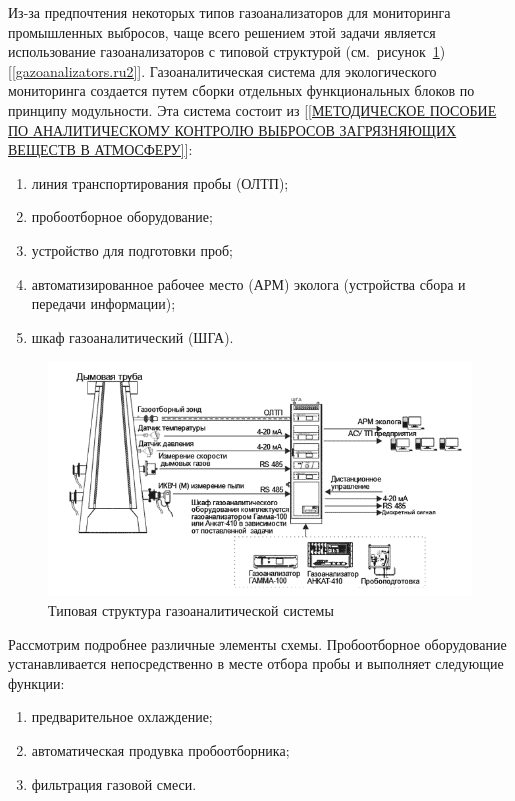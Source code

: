 \documentclass[14pt, a4paper]{extreport}
\begin{document}
	Из-за предпочтения некоторых типов газоанализаторов для мониторинга промышленных выбросов, чаще всего решением этой задачи является использование газоанализаторов с типовой структурой (см.~рисунок~\ref{fig:typestructure}) [\ref{gazoanalizators.ru2}]. Газоаналитическая система для экологического мониторинга создается путем сборки отдельных функциональных блоков по принципу модульности. Эта система состоит из [\ref{МЕТОДИЧЕСКОЕ ПОСОБИЕ ПО АНАЛИТИЧЕСКОМУ КОНТРОЛЮ ВЫБРОСОВ ЗАГРЯЗНЯЮЩИХ ВЕЩЕСТВ В АТМОСФЕРУ}]:
	\begin{enumerate}[label={\arabic*)}]
		\item линия транспортирования пробы (ОЛТП);
		\item пробоотборное оборудование;
		\item устройство для подготовки проб;
		\item автоматизированное рабочее место (АРМ) эколога (устройства сбора и передачи информации);
		\item шкаф газоаналитический (ШГА).
	\end{enumerate}
	
	\begin{figure}[h!]
		\centering
		\includegraphics[width = \textwidth]{image/chapter_1/typestructure}	
		\caption{Типовая структура газоаналитической системы}
		\label{fig:typestructure}
	\end{figure}
	
	Рассмотрим подробнее различные элементы схемы. Пробоотборное оборудование устанавливается непосредственно в месте отбора пробы и выполняет следующие функции:
	\begin{enumerate}[label={\arabic*)}]
		\item предварительное охлаждение;
		\item автоматическая продувка пробоотборника;
		\item фильтрация газовой смеси.
	\end{enumerate}
\end{document}
